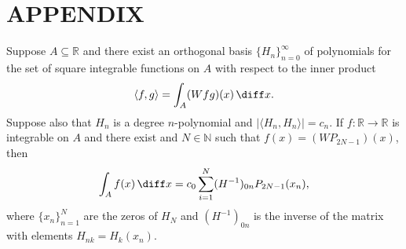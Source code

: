 \documentclass[11pt,english,a4paper]{article}
\begin{document}
\section*{\uppercase{Appendix}}
\begin{theorem}
Suppose $A \subseteq \mathbb{R}$ and there exist an orthogonal basis $\{H_n\}_{n=0}^\infty$ of polynomials for the set of square integrable functions on $A$ with respect to the inner product
\[
\langle f,g\rangle = \int_A (Wfg)(x)\, \diff x.
\]
Suppose also that $H_n$ is a degree $n$-polynomial and $|\langle H_n,H_n \rangle| = c_n$. If $f: \mathbb{R} \to \mathbb{R}$ is integrable on $A$ and there exist and $N \in \mathbb{N}$ such that $f(x) = (WP_{2N-1})(x)$, then 
\[
\int_A f(x)\, \diff x = c_0 \sum_{i=1}^N (H^{-1})_{0n} P_{2N-1}(x_n),
\]
where $\{x_n\}_{n=1}^N$ are the zeros of $H_N$ and $(H^{-1})_{0n}$ is the inverse of the matrix with elements $H_{nk} = H_k(x_n)$. \label{thm:quad}
\end{theorem}
\end{document}
